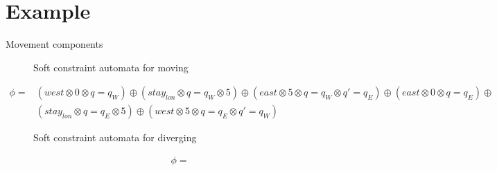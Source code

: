 \section{Example}

\begin{example}Movement components\\
\begin{figure}[H]
	\centering
	\resizebox{8cm}{!}{}
	\caption{Soft constraint automata for moving}\label{fig:myfigure}
\end{figure}

\begin{align*}
\phi = &(west \otimes 0 \otimes q=q_W) \oplus (stay_{lon} \otimes q=q_W \otimes 5) \oplus (east \otimes 5 \otimes q=q_W \otimes q'=q_E) \oplus (east \otimes 0 \otimes q=q_E) \oplus \\
		&(stay_{lon} \otimes q=q_E \otimes 5) \oplus (west \otimes 5 \otimes q=q_E \otimes q'=q_W)
\end{align*}

\begin{figure}[H]
	\centering
	\resizebox{7cm}{!}{}
	\caption{Soft constraint automata for diverging}\label{fig:myfigure}
\end{figure}
\end{example}

\begin{align*}
\phi = 
\end{align*}

